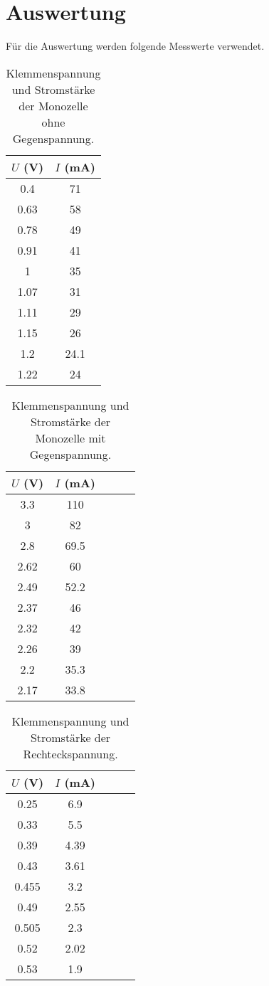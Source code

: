 \section{Auswertung}
\label{sec:Auswertung}

Für die Auswertung werden folgende Messwerte verwendet.
\begin{table}
  \centering
  \caption{Klemmenspannung und Stromstärke der Monozelle ohne Gegenspannung.}
  \label{tab:daten_plot1}
  \begin{tabular}{c c}
    \toprule
    $U$ (V) & $I$ (mA) \\
    \midrule
     0.4  &   71 \\
    0.63  &   58 \\
    0.78  &   49 \\
    0.91  &   41 \\
       1  &   35 \\
    1.07  &   31 \\
    1.11  &   29 \\
    1.15  &   26 \\
     1.2  & 24.1 \\
    1.22  &   24 \\
    \bottomrule
  \end{tabular}
\end{table}
\begin{table}
  \centering
  \caption{Klemmenspannung und Stromstärke der Monozelle mit Gegenspannung.}
  \label{tab:daten_plot2}
  \begin{tabular}{c c c c c}
    \toprule
    $U$ (V) & $I$ (mA) \\
    \midrule
     3.3 &  110 \\
       3 &   82 \\
     2.8 & 69.5 \\
    2.62 &   60 \\
    2.49 & 52.2 \\
    2.37 &   46 \\
    2.32 &   42 \\
    2.26 &   39 \\
     2.2 & 35.3 \\
    2.17 & 33.8 \\
    \bottomrule
  \end{tabular}
\end{table}
\begin{table}
  \centering
  \caption{Klemmenspannung und Stromstärke der Rechteckspannung.}
  \label{tab:daten_plot3}
  \begin{tabular}{c c c c c}
    \toprule
    $U$ (V) & $I$ (mA) \\
    \midrule
     0.25 &  6.9 \\
     0.33 &  5.5 \\
     0.39 & 4.39 \\
     0.43 & 3.61 \\
    0.455 &  3.2 \\
     0.49 & 2.55 \\
    0.505 &  2.3 \\
     0.52 & 2.02 \\
     0.53 &  1.9 \\
    \bottomrule
  \end{tabular}
\end{table}
